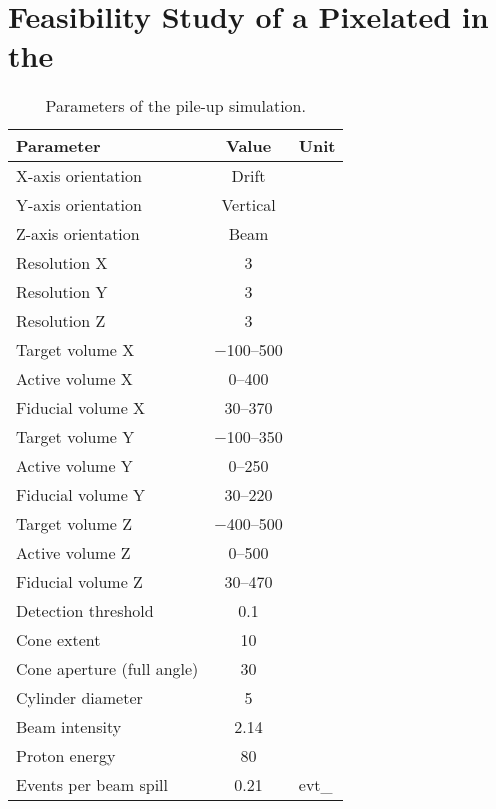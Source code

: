 \section{Feasibility Study of a Pixelated  in the }
\label{sec:dune-nd_pile-up-study}

\begin{table}[htb]
	\centering
	\caption[  pile-up simulation parameters]{%
		Parameters of the \Pgpz pile-up simulation.
	}
	\label{tab:dune-nd_pile-up-params}
	\begin{tabu} to \textwidth {lSs}
		\toprule
		Parameter &						{Value} &				{Unit} \\
		\midrule
		X-axis orientation &			{Drift} &				\\
		Y-axis orientation &			{Vertical} &			\\
		Z-axis orientation &			{Beam} &				\\
		Resolution X &					3 &						\milli\metre \\
		Resolution Y &					3 &						\milli\metre \\
		Resolution Z &					3 &						\milli\metre \\
		Target volume X &				\numrange{-100}{500} &	\centi\metre \\
		Active volume X &				\numrange{0}{400} &		\centi\metre \\
		Fiducial volume X &				\numrange{30}{370} &	\centi\metre \\
		Target volume Y &				\numrange{-100}{350} &	\centi\metre \\
		Active volume Y &				\numrange{0}{250} &		\centi\metre \\
		Fiducial volume Y &				\numrange{30}{220} &	\centi\metre \\
		Target volume Z &				\numrange{-400}{500} &	\centi\metre \\
		Active volume Z &				\numrange{0}{500} &		\centi\metre \\
		Fiducial volume Z &				\numrange{30}{470} &	\centi\metre \\
		Detection threshold &			0.1 &					\mega\electronvolt \\
		Cone extent &					10 &				 	\radlen \\
		Cone aperture (full angle) &	30 &					\degree \\
		Cylinder diameter &				5 &						\centi\metre \\
		Beam intensity &				2.14 &					\mega\watt \\
		Proton energy &					80 &					\giga\electronvolt \\
		Events per beam spill &			0.21 &					evt\per\tonne_{} \\
		\bottomrule
	\end{tabu}
\end{table}

